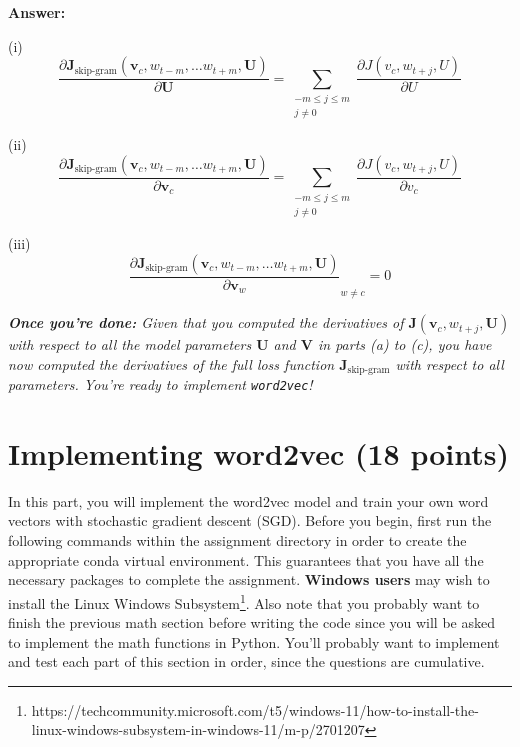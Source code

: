 \documentclass{article}
\newenvironment{answer}{
    {\bf Answer:} \sf \begingroup \color{red}%
}{\par\endgroup}%
\begin{document}
\begin{enumerate}[label=(\alph*)]
\begin{shaded}
\begin{answer}
(i) 
\begin{equation}
	\frac{\partial \bm J_{\textrm{skip-gram}}(\bm v_c, w_{t-m},\ldots w_{t+m}, \bm U)} {\partial \bm U} = \sum_{\substack{-m\leq j\leq m \\ j\neq 0}}\frac{\partial J(v_c,w_{t+j},U)}{\partial U}
\end{equation}

(ii)
\begin{equation}
	\frac{\partial \bm J_{\textrm{skip-gram}}(\bm v_c, w_{t-m},\ldots w_{t+m}, \bm U)} {\partial \bm v_c} = \sum_{\substack{-m\leq j\leq m \\ j\neq 0}}\frac{\partial J(v_c,w_{t+j},U)}{\partial v_c}
\end{equation}

(iii) 
\begin{equation}
	\frac{\partial \bm J_{\textrm{skip-gram}}(\bm v_c, w_{t-m},\ldots w_{t+m}, \bm U)} {\partial \bm v_w}_{w\neq c} = 0
\end{equation}
\end{answer}
\end{shaded}

\textit{\textbf{Once you're done:} Given that you computed the derivatives of $\bm J(\bm v_c, w_{t+j}, \bm U)$ with respect to all the model parameters $\bm U$ and $\bm V$ in parts (a) to (c), you have now computed the derivatives of the full loss function $\bm J_{\text{skip-gram}}$ with respect to all parameters. You're ready to implement \texttt{word2vec}!} %

\end{enumerate}

\section{Implementing word2vec (18 points)}
In this part, you will implement the word2vec model and train your own word vectors with stochastic gradient descent (SGD). Before you begin, first run the following commands within the assignment directory in order to create the appropriate conda virtual environment. This guarantees that you have all the necessary packages to complete the assignment. \textbf{Windows users} may wish to install the Linux Windows Subsystem\footnote{https://techcommunity.microsoft.com/t5/windows-11/how-to-install-the-linux-windows-subsystem-in-windows-11/m-p/2701207}. Also note that you probably want to finish the previous math section before writing the code since you will be asked to implement the math functions in Python. You’ll probably want to implement and test each part of this section in order, since the questions are cumulative.
\end{document}
